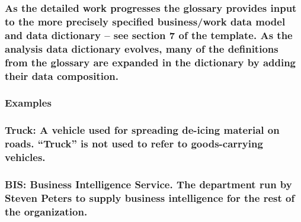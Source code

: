 \documentclass[
]{article}
\begin{document}
\hypertarget{as-the-detailed-work-progresses-the-glossary-provides-input-to-the-more-precisely-specified-businesswork-data-model-and-data-dictionary-see-section-7-of-the-template.-as-the-analysis-data-dictionary-evolves-many-of-the-definitions-from-the-glossary-are-expanded-in-the-dictionary-by-adding-their-data-composition.}{%
\subsubsection{As the detailed work progresses the glossary provides
input to the more precisely specified business/work data model and data
dictionary -- see section 7 of the template. As the analysis data
dictionary evolves, many of the definitions from the glossary are
expanded in the dictionary by adding their data
composition.}\label{as-the-detailed-work-progresses-the-glossary-provides-input-to-the-more-precisely-specified-businesswork-data-model-and-data-dictionary-see-section-7-of-the-template.-as-the-analysis-data-dictionary-evolves-many-of-the-definitions-from-the-glossary-are-expanded-in-the-dictionary-by-adding-their-data-composition.}}

\hypertarget{examples-8}{%
\subsubsection{Examples}\label{examples-8}}

\hypertarget{truck-a-vehicle-used-for-spreading-de-icing-material-on-roads.-truck-is-not-used-to-refer-to-goods-carrying-vehicles.}{%
\subsubsection{\texorpdfstring{Truck: A vehicle used for spreading
de-icing material on roads. ``Truck'' is not used to refer to
goods-carrying vehicles.
}{Truck: A vehicle used for spreading de-icing material on roads. ``Truck'' is not used to refer to goods-carrying vehicles. }}\label{truck-a-vehicle-used-for-spreading-de-icing-material-on-roads.-truck-is-not-used-to-refer-to-goods-carrying-vehicles.}}

\hypertarget{bis-business-intelligence-service.-the-department-run-by-steven-peters-to-supply-business-intelligence-for-the-rest-of-the-organization.}{%
\subsubsection{\texorpdfstring{BIS: Business Intelligence Service. The
department run by Steven Peters to supply business intelligence for the
rest of the organization.
}{BIS: Business Intelligence Service. The department run by Steven Peters to supply business intelligence for the rest of the organization. }}\label{bis-business-intelligence-service.-the-department-run-by-steven-peters-to-supply-business-intelligence-for-the-rest-of-the-organization.}}
\end{document}
